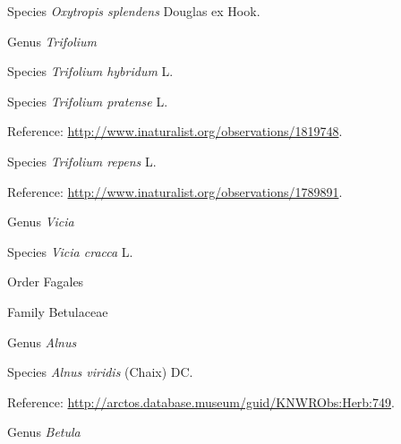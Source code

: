 \documentclass[9pt, article]{memoir}
\begin{document}
\begin{multicols}{2}
\vspace{6pt}\noindent\hspace{36pt}Species \textit{Oxytropis splendens} Douglas ex Hook.


\vspace{6pt}\noindent\hspace{30pt}Genus \textit{Trifolium}


\vspace{6pt}\noindent\hspace{36pt}Species \textit{Trifolium hybridum} L.


\vspace{6pt}\noindent\hspace{36pt}Species \textit{Trifolium pratense} L.


\vspace{6pt}Reference: 
\url{http://www.inaturalist.org/observations/1819748}.

\vspace{6pt}\noindent\hspace{36pt}Species \textit{Trifolium repens} L.


\vspace{6pt}Reference: 
\url{http://www.inaturalist.org/observations/1789891}.

\vspace{6pt}\noindent\hspace{30pt}Genus \textit{Vicia}


\vspace{6pt}\noindent\hspace{36pt}Species \textit{Vicia cracca} L.


\vspace{6pt}\noindent\hspace{18pt}Order Fagales


\vspace{6pt}\noindent\hspace{24pt}Family Betulaceae


\vspace{6pt}\noindent\hspace{30pt}Genus \textit{Alnus}


\vspace{6pt}\noindent\hspace{36pt}Species \textit{Alnus viridis} (Chaix) DC.


\vspace{6pt}Reference: 
\url{http://arctos.database.museum/guid/KNWRObs:Herb:749}.

\vspace{6pt}\noindent\hspace{30pt}Genus \textit{Betula}



\end{multicols}
\end{document}
